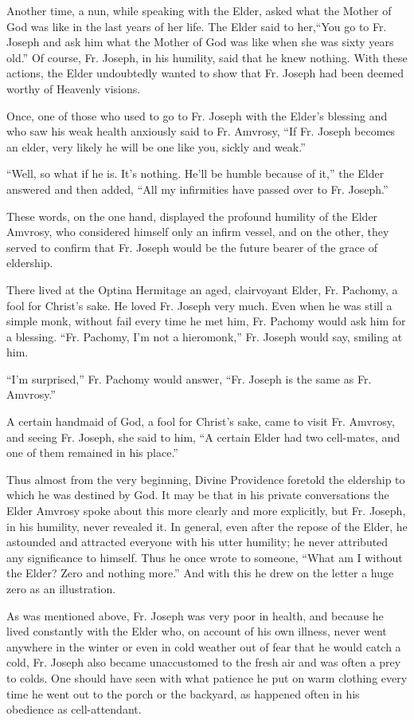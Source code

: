 Another time, a nun, while speaking with the Elder, asked what the Mother of God was like in the last years of her life. The Elder said to her,“You go to Fr. Joseph and ask him what the Mother of God was like when she was sixty years old.” Of course, Fr. Joseph, in his humility, said that he knew nothing. With these actions, the Elder undoubtedly wanted to show that Fr. Joseph had been deemed worthy of Heavenly visions.

Once, one of those who used to go to Fr. Joseph with the Elder's blessing and who saw his weak health anxiously said to Fr. Amvrosy, “If Fr. Joseph becomes an elder, very likely he will be one like you, sickly and weak.”

“Well, so what if he is. It's nothing. He'll be humble because of it,” the Elder answered and then added, “All my infirmities have passed over to Fr. Joseph.”

These words, on the one hand, displayed the profound humility of the Elder Amvrosy, who considered himself only an infirm vessel, and on the other, they served to confirm that Fr. Joseph would be the future bearer of the grace of eldership.

There lived at the Optina Hermitage an aged, clairvoyant Elder, Fr. Pachomy, a fool for Christ's sake. He loved Fr. Joseph very much. Even when he was still a simple monk, without fail every time he met him, Fr. Pachomy would ask him for a blessing. “Fr. Pachomy, I'm not a hieromonk,” Fr. Joseph would say, smiling at him.

“I'm surprised,” Fr. Pachomy would answer, “Fr. Joseph is the same as Fr. Amvrosy.”

\label{lady-before}A certain handmaid of God, a fool for Christ's sake, came to visit Fr. Amvrosy, and seeing Fr. Joseph, she said to him, “A certain Elder had two cell-mates, and one of them remained in his place.”

Thus almost from the very beginning, Divine Providence foretold the eldership to which he was destined by God. It may be that in his private conversations the Elder Amvrosy spoke about this more clearly and more explicitly, but Fr. Joseph, in his humility, never revealed it. In general, even after the repose of the Elder, he astounded and attracted everyone with his utter humility; he never attributed any significance to himself. Thus he once wrote to someone, “What am I without the Elder? Zero and nothing more.” And with this he drew on the letter a huge zero as an illustration.

As was mentioned above, Fr. Joseph was very poor in health, and because he lived constantly with the Elder who, on account of his own illness, never went anywhere in the winter or even in cold weather out of fear that he would catch a cold, Fr. Joseph also became unaccustomed to the fresh air and was often a prey to colds. One should have seen with what patience he put on warm clothing every time he went out to the porch or the backyard, as happened often in his obedience as cell-attendant.

